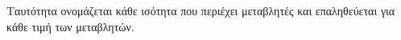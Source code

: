 Ταυτότητα ονομάζεται κάθε ισότητα που περιέχει μεταβλητές και επαληθεύεται για κάθε τιμή των μεταβλητών.
